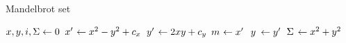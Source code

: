\documentclass{article}
\newcommand{\minbox}[2]{%
  \mathmakebox[\ifdim#1<\width\width\else#1\fi]{#2}}
\newcommand{\Let}[2]{\State $ \minbox{1em}{#1} \gets #2 $}
\begin{document}
\begin{algorithm}
  \caption{Mandelbrot set}
  \label{alg:mandelbrot}
  \begin{algorithmic}[1]
      \Let{x, y, i, \Sigma}{0}
        \Let{x^\prime}{x^2 - y^2 + c_x}
        \Let{y^\prime}{2xy + c_y}
        \Let{m}{x^\prime}
        \Let{y}{y^\prime}
        \Let{\Sigma}{x^2 + y^2}
      \EndWhile
        \State {}
      \EndIf
      \State{}
    \EndFunction
  \end{algorithmic}
\end{algorithm}
\end{document}
